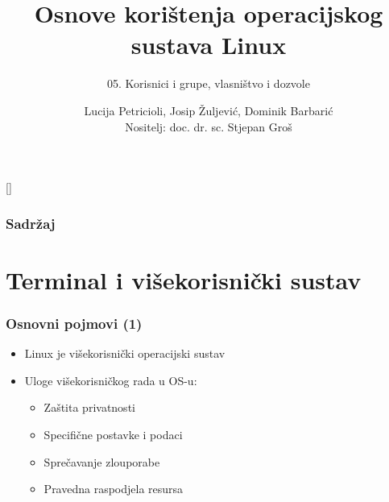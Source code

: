 \documentclass[table,usenames,dvipsnames] {beamer}
\title{Osnove korištenja operacijskog sustava Linux}
\subtitle{05. Korisnici i grupe, vlasništvo i dozvole}
\author[Lucija Petricioli, Josip Žuljević, Dominik Barbarić]{Lucija Petricioli, Josip Žuljević, Dominik Barbarić\\{\small Nositelj: doc. dr. sc. Stjepan Groš}}
\institute[FER]{Sveučilište u Zagrebu \\
				Fakultet elektrotehnike i računarstva}
\date{\todayiso}
\begin{document}
{
[] %

\begin{frame}
\maketitle
\end{frame}
}

\begin{frame}
\frametitle{Sadržaj}
\tableofcontents
\end{frame}

\section{Terminal i višekorisnički sustav}
\begin{frame}[t]
\frametitle{Osnovni pojmovi (1)}
\begin{itemize}
  \item Linux je višekorisnički operacijski sustav
  \vfill
  \item Uloge višekorisničkog rada u OS-u:
  \begin{itemize}
    \item Zaštita privatnosti
    \item Specifične postavke i podaci
    \item Sprečavanje zlouporabe
    \item Pravedna raspodjela resursa
  \end{itemize}
\end{itemize}
\end{frame}
\end{document}

